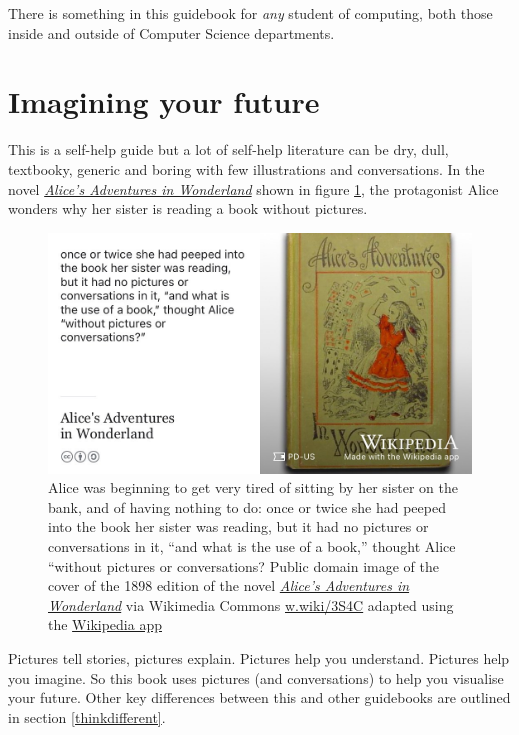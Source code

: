 \documentclass[
]{book}
\begin{document}
There is something in this guidebook for \emph{any} student of computing, both those inside and outside of Computer Science departments. 👨🏿‍💻👨‍💻👩🏽‍💻👩‍💻👩🏿‍💻

\hypertarget{picturethis}{%
\section{Imagining your future}\label{picturethis}}

This is a self-help guide but a lot of self-help literature can be dry, dull, textbooky, generic and boring with few illustrations and conversations. In the novel \emph{\href{https://en.wikipedia.org/wiki/Alice\%27s_Adventures_in_Wonderland}{Alice's Adventures in Wonderland}} \citep{wonderland} shown in figure \ref{fig:aiw-fig}, the protagonist Alice wonders why her sister is reading a book without pictures.

\begin{figure}
\includegraphics[width=0.99\linewidth]{images/alicequotation} \caption{Alice was beginning to get very tired of sitting by her sister on the bank, and of having nothing to do: once or twice she had peeped into the book her sister was reading, but it had no pictures or conversations in it, ``and what is the use of a book,'' thought Alice ``without pictures or conversations? \citep{wonderland} Public domain image of the cover of the 1898 edition of the novel \emph{\href{https://en.wikipedia.org/wiki/Alice\%27s_Adventures_in_Wonderland}{Alice's Adventures in Wonderland}} via Wikimedia Commons \href{https://w.wiki/3S4C}{w.wiki/3S4C} adapted using the \href{https://apps.apple.com/us/app/wikipedia/id324715238}{Wikipedia app}}\label{fig:aiw-fig}
\end{figure}



Pictures tell stories, pictures explain. Pictures help you understand. Pictures help you imagine. So this book uses pictures (and conversations) to help you visualise your future. Other key differences between this and other guidebooks are outlined in section \ref{thinkdifferent}.
\end{document}
